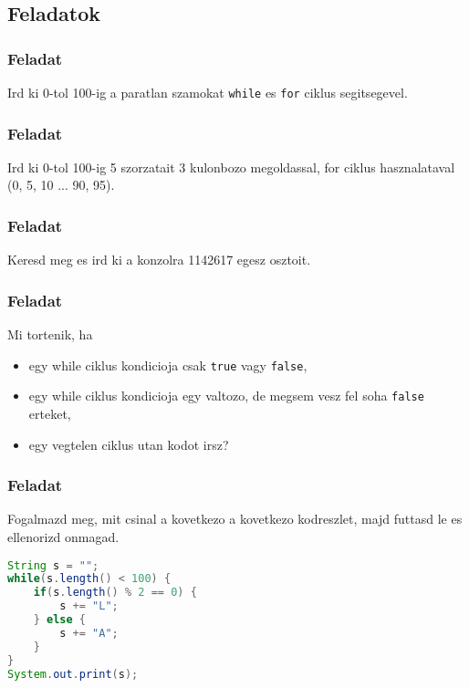 \documentclass{article}
\begin{document}
\subsection{Feladatok}

\subsubsection{Feladat}

Ird ki 0-tol 100-ig a paratlan szamokat \lstinline{while} es \lstinline{for} ciklus segitsegevel.

\subsubsection{Feladat}

Ird ki 0-tol 100-ig 5 szorzatait 3 kulonbozo megoldassal, for ciklus hasznalataval (0, 5, 10 ... 90, 95).

\subsubsection{Feladat}

Keresd meg es ird ki a konzolra 1142617 egesz osztoit.

\subsubsection{Feladat}

Mi tortenik, ha
\begin{itemize}
    \item egy while ciklus kondicioja csak \lstinline{true} vagy \lstinline{false},
    \item egy while ciklus kondicioja egy valtozo, de megsem vesz fel soha \lstinline{false} erteket,
    \item egy vegtelen ciklus utan kodot irsz?
\end{itemize}

\newpage

\subsubsection{Feladat}

Fogalmazd meg, mit csinal a kovetkezo a kovetkezo kodreszlet, majd futtasd le es ellenorizd onmagad.

\begin{lstlisting}[language=Java, caption=Feladat]
String s = "";
while(s.length() < 100) {
    if(s.length() % 2 == 0) {
        s += "L";
    } else {
        s += "A";
    }
}
System.out.print(s);
\end{lstlisting}
\end{document}

